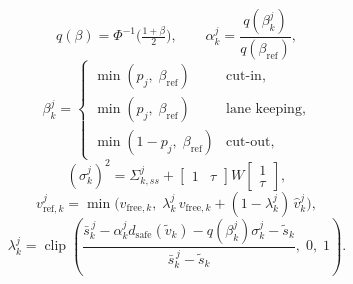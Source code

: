 \documentclass[letterpaper, 10 pt, journal]{IEEEtran}
\begin{document}
\begin{equation}
    q(\beta) = \Phi^{-1}\!\Big(\tfrac{1+\beta}{2}\Big), \qquad
    \alpha^j_k = \frac{q(\beta^j_k)}{q(\beta_{\mathrm{ref}})},
    \label{eq:alpha}
\end{equation}
\begin{equation}
    \beta^j_k =
    \begin{cases}
        \min(p_j,\; \beta_{\mathrm{ref}}) & \text{cut-in}, \\
        \min(p_j,\; \beta_{\mathrm{ref}}) & \text{lane keeping}, \\
        \min(1 - p_j,\; \beta_{\mathrm{ref}}) & \text{cut-out},
    \end{cases}
    \label{eq:beta}
\end{equation}
\begin{equation}
    (\sigma^j_k)^2 = \Sigma^{j}_{k,ss} + \begin{bmatrix} 1 & \tau \end{bmatrix}
    W \begin{bmatrix} 1 \\ \tau \end{bmatrix},
    \label{eq:sigma}
\end{equation}
\begin{equation}
    v^j_{\mathrm{ref},k} = \min\!\big(v_{\mathrm{free},k},\;
    \lambda^j_k\, v_{\mathrm{free},k} + (1-\lambda^j_k)\, \hat v^j_k\big),
    \label{eq:vref}
\end{equation}
\begin{equation}
    \lambda^j_k = \operatorname{clip}\!\left(
        \frac{\bar s^{\,j}_k - \alpha^j_k d_{\mathrm{safe}}(\tilde v_k) - q(\beta^j_k)\sigma^j_k - \tilde s_k}
             {\bar s^{\,j}_k - \tilde s_k},\; 0,\; 1\right).
    \label{eq:vref_blend}
\end{equation}
\end{document}
